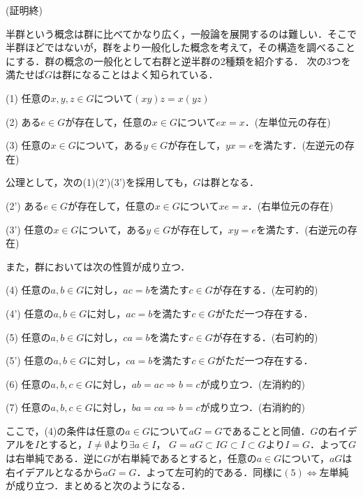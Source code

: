 \begin{flushright}
(証明終)
\end{flushright}
半群という概念は群に比べてかなり広く，一般論を展開するのは難しい．そこで半群ほどではないが，群をより一般化した概念を考えて，その構造を調べることにする．群の概念の一般化として右群と逆半群の2種類を紹介する．
次の3つを満たせば$G$は群になることはよく知られている．
\begin{description}
\item{(1)} 任意の$x,y,z\in G$について$(xy)z=x(yz)$
\item{(2)} ある$e\in G$が存在して，任意の$x\in G$について$ex=x$．(左単位元の存在)
\item{(3)} 任意の$x\in G$について，ある$y\in G$が存在して，$yx=e$を満たす．(左逆元の存在)
\end{description}
公理として，次の(1)(2')(3')を採用しても，$G$は群となる．
\begin{description}
\item{(2')} ある$e\in G$が存在して，任意の$x\in G$について$xe=x$．(右単位元の存在)
\item{(3')} 任意の$x\in G$について，ある$y\in G$が存在して，$xy=e$を満たす．(右逆元の存在)
\end{description}
また，群においては次の性質が成り立つ．
\begin{description}
\item{(4)} 任意の$a,b\in G$に対し，$ac=b$を満たす$c\in G$が存在する．(左可約的)
\item{(4')} 任意の$a,b\in G$に対し，$ac=b$を満たす$c\in G$がただ一つ存在する．
\item{(5)} 任意の$a,b\in G$に対し，$ca=b$を満たす$c\in G$が存在する．(右可約的)
\item{(5')} 任意の$a,b\in G$に対し，$ca=b$を満たす$c\in G$がただ一つ存在する．
\item{(6)} 任意の$a,b,c\in G$に対し，$ab=ac\Rightarrow b=c$が成り立つ．(左消約的)
\item{(7)} 任意の$a,b,c\in G$に対し，$ba=ca\Rightarrow b=c$が成り立つ．(右消約的)
\end{description}
ここで，(4)の条件は任意の$a\in G$について$aG=G$であることと同値．$G$の右イデアルを$I$とすると，$I \neq \emptyset より \exists a \in I$， $G=aG\subset IG\subset I\subset G$より$I=G$．よって$G$は右単純である．逆に$G$が右単純であるとすると，任意の$a\in G$について，$aG$は右イデアルとなるから$aG=G$．よって左可約的である．同様に$(5)\Longleftrightarrow$左単純が成り立つ．まとめると次のようになる．
